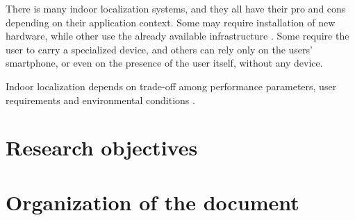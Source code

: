 There is many indoor localization systems, and they all have their pro and cons depending on their application context. Some may require installation of new hardware, while other use the already available infrastructure \cite{ali_locali_2017}. Some require the user to carry a specialized device, and others can rely only on the users' smartphone, or even on the presence of the user itself, without any device.

Indoor localization depends on trade-off among performance parameters, user requirements and environmental conditions \cite{mainetti_survey_2014}.

\section{Research objectives}



\section{Organization of the document}


